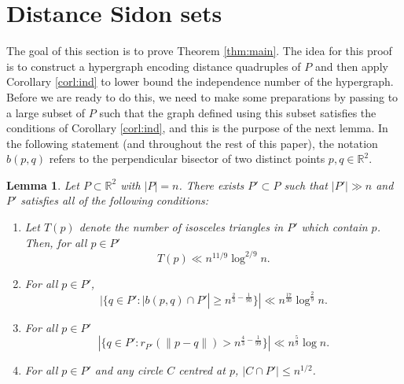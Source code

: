 \documentclass[11pt,oneside]{amsart}
\numberwithin{exercise}{subsection}
\newtheorem{lemma}{Lemma}
\begin{document}
\section{Distance Sidon sets}
\label{sec:distance}

The goal of this section is to prove Theorem \ref{thm:main}. The idea for this proof is to construct a hypergraph encoding distance quadruples of $P$ and then apply Corollary \ref{corl:ind} to lower bound the independence number of the hypergraph. Before we are ready to do this, we need to make some preparations by passing to a large subset of $P$ such that the graph defined using this subset satisfies the conditions of Corollary \ref{corl:ind}, and this is the purpose of the next lemma. In the following statement (and throughout the rest of this paper), the notation $b(p,q)$ refers to the perpendicular bisector of two distinct points $p,q \in \mathbb R^2$.

\begin{lemma} \label{lem:subset}
Let $P \subset \mathbb R^2$ with $|P|=n$. There exists $P' \subset P$ such that $|P'| \gg n$ and $P'$ satisfies all of the following conditions:
\begin{enumerate}[label=(\alph*)]
    \item Let $T(p)$ denote the number of isosceles triangles in $P'$ which contain $p$. Then, for all $p \in P'$
    \[
T(p) \ll n^{11/9} \log^{2/9}n.
    \]
    \item For all $p \in P'$,
    \[
    | \{ q \in P' : |b(p,q) \cap P'| \geq n^{\frac{2}{3}- \frac{1}{90}} \}| \ll n^{\frac{17}{30}} \log^{\frac{2}{9}}n.
    \]
    \item For all $p \in P'$
    \[
    |\{ q \in P' : r_{P'}(\|p-q\|) > n^{\frac{4}{3}-\frac{1}{99}} \}| \ll n^{\frac{5}{9}} \log n.
    \]
    \item For all $p \in P'$ and any circle $C$ centred at $p$, $|C \cap P'| \leq n^{1/2}$.
\end{enumerate}
\end{lemma}
\end{document}
